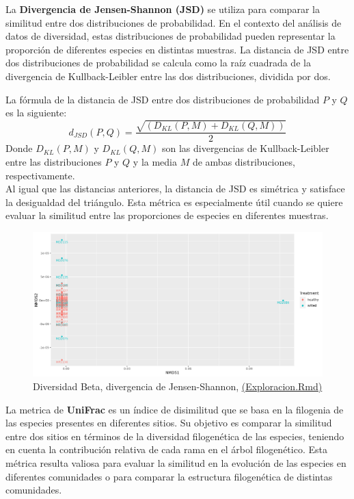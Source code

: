 La \textbf{Divergencia de Jensen-Shannon (JSD)} se utiliza para comparar la similitud entre dos distribuciones de probabilidad. En el contexto del análisis de datos de diversidad, estas distribuciones de probabilidad pueden representar la proporción de diferentes especies en distintas muestras. La distancia de JSD entre dos distribuciones de probabilidad se calcula como la raíz cuadrada de la divergencia de Kullback-Leibler entre las dos distribuciones, dividida por dos. 

La fórmula de la distancia de JSD entre dos distribuciones de probabilidad $P$ y $Q$ es la siguiente:
$$d_{JSD}(P, Q) = \frac{\sqrt{(D_{KL}(P, M) + D_{KL}(Q, M))}}{2}$$
Donde $D_{KL}(P, M)$ y $D_{KL}(Q, M)$ son las divergencias de Kullback-Leibler entre las distribuciones $P$ y $Q$ y la media $M$ de ambas distribuciones, respectivamente. \\

Al igual que las distancias anteriores, la distancia de JSD es simétrica y satisface la desigualdad del triángulo. Esta métrica es especialmente útil cuando se quiere evaluar la similitud entre las proporciones de especies en diferentes muestras.\\

\begin{figure}[!]
\centering
\includegraphics[width=\textwidth]{Img/cap2/DiversidadBetaFresaKraken_fil_jsd.png}
\caption{Diversidad Beta, divergencia de Jensen-Shannon,  \href{https://github.com/CamilaSilva1995/Tesis_Maestria/blob/main/Analisis_Comparativo/Fresa_Solena/01_Exploracion.Rmd}{(Exploracion.Rmd)}}
\end{figure}

La metrica de \textbf{UniFrac} es un índice de disimilitud que se basa en la filogenia de las especies presentes en diferentes sitios. Su objetivo es comparar la similitud entre dos sitios en términos de la diversidad filogenética de las especies, teniendo en cuenta la contribución relativa de cada rama en el árbol filogenético. Esta métrica resulta valiosa para evaluar la similitud en la evolución de las especies en diferentes comunidades o para comparar la estructura filogenética de distintas comunidades.\\


